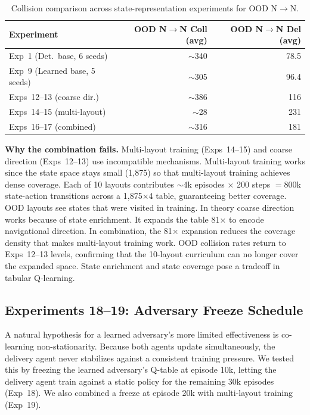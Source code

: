 \documentclass[sigconf]{aamas}
\begin{document}
\begin{table}[H]
\caption{Collision comparison across state-representation experiments for OOD N$\to$N.}
\label{tab:cd-collision}
\centering
\footnotesize
\begin{tabular}{lrr}
\toprule
\textbf{Experiment} & \textbf{OOD N$\to$N Coll (avg)} & \textbf{OOD N$\to$N Del (avg)} \\
\midrule
Exp~1 (Det.\ base, 6 seeds)    & $\sim$340 & 78.5 \\
Exp~9 (Learned base, 5 seeds) & $\sim$305 & 96.4 \\
Exps~12--13 (coarse dir.)         & $\sim$386 & 116  \\
Exps~14--15 (multi-layout)        & $\sim$28  & 231  \\
Exps~16--17 (combined)            & $\sim$316 & 181  \\
\bottomrule
\end{tabular}
\end{table}

\textbf{Why the combination fails.} Multi-layout training (Exps~14--15) and coarse
direction (Exps~12--13) use incompatible mechanisms. Multi-layout training
works since the state space stays small (1,875) so that
multi-layout training achieves dense coverage. Each of 10 layouts contributes
$\sim$4k episodes $\times$ 200 steps $= 800$k state-action transitions across a
1,875$\times$4 table, guaranteeing better coverage. OOD layouts see states that were visited in training. In theory coarse direction works because of state enrichment. It
expands the table 81$\times$ to encode navigational direction. In combination, the
81$\times$ expansion reduces the coverage density that makes multi-layout training
work. OOD collision rates return to Exps~12--13 levels, confirming that the 10-layout
curriculum can no longer cover the expanded space. State enrichment and state coverage pose a tradeoff in tabular Q-learning.

\subsection{Experiments 18--19: Adversary Freeze Schedule}
\label{sec:freeze}

A natural hypothesis for a learned adversary's more limited effectiveness is co-learning
non-stationarity. Because both agents update simultaneously, the delivery
agent never stabilizes against a consistent training pressure. We tested this by
freezing the learned adversary's Q-table at episode 10k, letting the delivery agent
train against a static policy for the remaining 30k episodes (Exp~18). We also
combined a freeze at episode 20k with multi-layout training (Exp~19).
\end{document}
